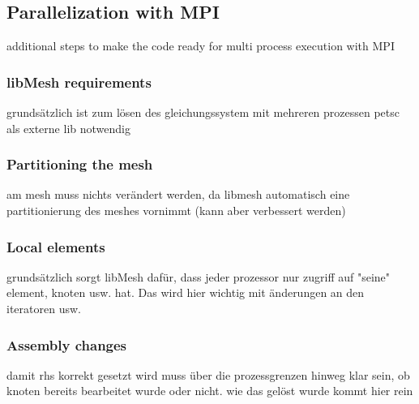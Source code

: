  
 
 \subsection{Parallelization with MPI}
 additional steps to make the code ready for multi process execution with MPI\\
  \subsubsection{libMesh requirements}
   grundsätzlich ist zum lösen des gleichungssystem mit mehreren prozessen petsc als externe lib notwendig
  
  \subsubsection{Partitioning the mesh}
   am mesh muss nichts verändert werden, da libmesh automatisch eine partitionierung des meshes vornimmt (kann aber verbessert werden)
   
  \subsubsection{Local elements}
   grundsätzlich sorgt libMesh dafür, dass jeder prozessor nur zugriff auf "seine" element, knoten usw. hat. Das wird hier wichtig mit änderungen an den iteratoren usw.
  
  \subsubsection{Assembly changes}
   damit rhs korrekt gesetzt wird muss über die prozessgrenzen hinweg klar sein, ob knoten bereits bearbeitet wurde oder nicht. wie das gelöst wurde kommt hier rein\newline
